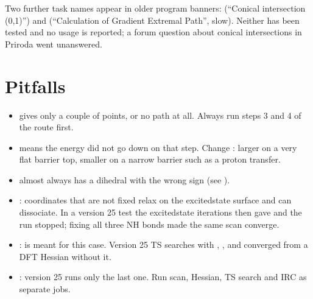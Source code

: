 \documentclass[letterpaper,10pt,english,openany,oneside]{sphinxmanual}
\begin{document}
\sphinxAtStartPar
Two further task names appear in older program banners:  (“Conical intersection (0,1)”) and 
(“Calculation of Gradient Extremal Path”, slow). Neither has been tested and no usage is reported; a forum question
about conical intersections in Priroda went unanswered.




\section{Pitfalls}
\label{\detokenize{tasks/ts-irc-scan:pitfalls}}\begin{itemize}
\item {} 
\sphinxAtStartPar
{} gives only a couple of points, or no path at all. Always run
steps 3 and 4 of the route first.

\item {} 
\sphinxAtStartPar
{} means the energy did not go down on that step.
Change {\hyperref[\detokenize{reference/optimize:optimize-radius}]{}}: larger on a very flat barrier top, smaller on a narrow barrier such as a
proton transfer.

\item {} 
\sphinxAtStartPar
{} almost always has a dihedral with the wrong sign (see
{\hyperref[\detokenize{tasks/ts-irc-scan:the-dihedral-sign}]{}}).

\item {} 
\sphinxAtStartPar
{}: coordinates that are not fixed relax on the excited\sphinxhyphen{}state surface and can dissociate. In a
version 25 test the excited\sphinxhyphen{}state iterations then gave  and the run stopped; fixing all three N\textendash{}H bonds made
the same scan converge.

\item {} 
\sphinxAtStartPar
{}: {\hyperref[\detokenize{reference/optimize:optimize-gradient}]{}} is meant for this case.
Version 25 TS searches with , ,  and  converged from a DFT Hessian without it.

\item {} 
\sphinxAtStartPar
{}: version 25 runs only the last one. Run scan, Hessian, TS search and IRC as separate
jobs.

\end{itemize}
\end{document}
